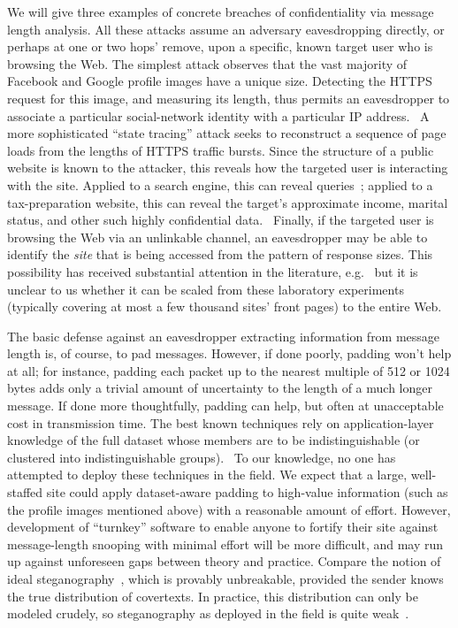 \documentclass[twoside]{zarticle}
\begin{document}
We will give three examples of concrete breaches of confidentiality
via message length analysis.  All these attacks assume an adversary
eavesdropping directly, or perhaps at one or two hops' remove, upon a
specific, known target user who is browsing the Web.  The simplest
attack observes that the vast majority of Facebook and Google profile
images have a unique size.  Detecting the HTTPS request for this
image, and measuring its length, thus permits an eavesdropper to
associate a particular social-network identity with a particular IP
address.~\cite{herrmann2012analyzing, pironti2012identifying} A more
sophisticated “state tracing” attack seeks to reconstruct a sequence
of page loads from the lengths of HTTPS traffic bursts.  Since the
structure of a public website is known to the attacker, this reveals
how the targeted user is interacting with the site.  Applied to a
search engine, this can reveal queries~\cite{castelluccia2010private};
applied to a tax-preparation website, this can reveal the target's
approximate income, marital status, and other such highly confidential
data.~\cite{zhang2010sidebuster} Finally, if the targeted user is
browsing the Web via an unlinkable channel, an eavesdropper may be
able to identify the \emph{site} that is being accessed from the
pattern of response sizes.  This possibility has received substantial
attention in the literature, e.g.~\cite{cai2012touching,
  cheng1998traffic, coull2007web, dyer2012peekaboo} but it is unclear
to us whether it can be scaled from these laboratory experiments
(typically covering at most a few thousand sites' front pages) to the
entire Web.

The basic defense against an eavesdropper extracting information from
message length is, of course, to pad messages.  However, if done
poorly, padding won't help at all; for instance, padding each packet
up to the nearest multiple of 512 or 1024 bytes adds only a trivial
amount of uncertainty to the length of a much longer message.  If done
more thoughtfully, padding can help, but often at unacceptable cost in
transmission time.  The best known techniques rely on
application-layer knowledge of the full dataset whose members are to
be indistinguishable (or clustered into indistinguishable
groups).~\cite{chen2010side, mather2012pinpointing,
  backes2013sidechannel} To our knowledge, no one has attempted to
deploy these techniques in the field.  We expect that a large,
well-staffed site could apply dataset-aware padding to high-value
information (such as the profile images mentioned above) with a
reasonable amount of effort.  However, development of “turnkey”
software to enable anyone to fortify their site against message-length
snooping with minimal effort will be more difficult, and may run up
against unforeseen gaps between theory and practice.  Compare the
notion of ideal steganography~\cite{hopper2009provably}, which is
provably unbreakable, provided the sender knows the true distribution
of covertexts.  In practice, this distribution can only be modeled
crudely, so steganography as deployed in the field is quite
weak~\cite{boehme2010steganalysis}.
\end{document}
